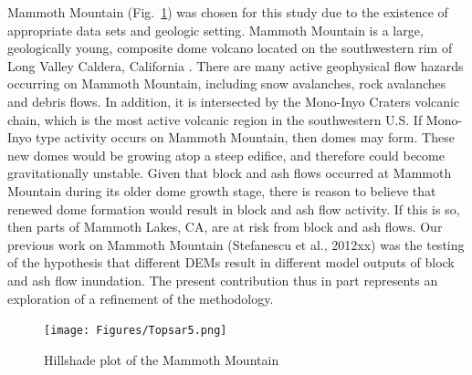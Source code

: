\documentclass[12pt,letterpaper]{article}
\begin{document}
Mammoth Mountain (Fig.~\ref{fig:fig1}) was chosen for this study due to the existence of appropriate data sets and geologic setting. 
Mammoth Mountain is a large, geologically young, composite dome
volcano located on the southwestern rim of Long Valley Caldera,
California \citep{Bailey1989}.  There are many active geophysical flow hazards 
occurring on Mammoth Mountain, including snow avalanches, rock avalanches and
debris flows. In addition, it is intersected by the Mono-Inyo Craters
volcanic chain, which is the most active volcanic region in the
southwestern U.S.  If Mono-Inyo type activity occurs on Mammoth
Mountain, then domes may form.  These new domes would be growing atop
a steep edifice, and therefore could become gravitationally unstable.
Given that block and ash flows occurred at Mammoth Mountain during its
older dome growth stage, there is reason to believe that renewed dome
formation would result in block and ash flow activity. If this is so,
then parts of Mammoth Lakes, CA, are at risk from block and ash flows.
Our previous work on Mammoth Mountain (Stefanescu et al., 2012xx)
was the testing of the hypothesis that different DEMs result in
different model outputs of block and ash flow inundation.  The present contribution thus in part represents an exploration of a refinement of the methodology.

\begin{figure}[ht!]
\center
      \texttt{[image: Figures/Topsar5.png]}\\
  \caption{Hillshade plot of the Mammoth Mountain  }\label{fig:fig1}
\end{figure}
\end{document}

